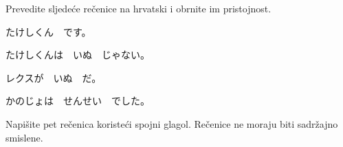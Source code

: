 
\author{Ivan Petranović}

	
	\begin{mondai}{Prevedite sljedeće rečenice na hrvatski i obrnite im pristojnost.}
		\item たけしくん　です。
		\item たけしくんは　いぬ　じゃない。
		\item レクスが　いぬ　だ。
		\item かのじょは　せんせい　でした。
	\end{mondai}

	Napišite pet rečenica koristeći spojni glagol. Rečenice ne moraju biti sadržajno smislene.

